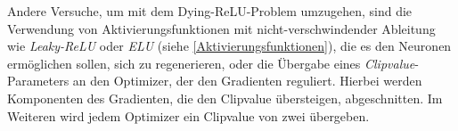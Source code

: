 Andere Versuche, um mit dem Dying-ReLU-Problem umzugehen, sind die Verwendung von Aktivierungsfunktionen mit nicht-verschwindender Ableitung wie \textit{Leaky-ReLU} oder \textit{ELU} (siehe \textsf{\autoref{Aktivierungsfunktionen}}), die es den Neuronen ermöglichen sollen, sich zu regenerieren, oder die Übergabe eines \textit{Clipvalue}-Parameters an den Optimizer, der den Gradienten reguliert. Hierbei werden Komponenten des Gradienten, die den Clipvalue übersteigen, abgeschnitten. Im Weiteren wird jedem Optimizer ein Clipvalue von zwei übergeben. 
\begin{figure}[ht]
	\centering

\end{figure}
